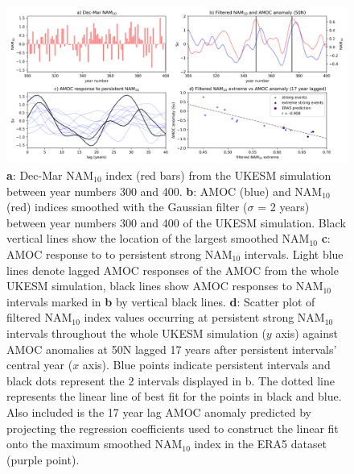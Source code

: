 \begin{figure}[h!]
\begin{center}
\noindent\includegraphics[width =\linewidth]{Figures/Figures-surface/AMOC_response_special_events.png} 
\caption[Regression of NAM$_{10}$ extreme magnitude vs AMOC anomaly at 50N]{\textbf{a}: Dec-Mar NAM$_{10}$ index (red bars) from the UKESM simulation between year numbers 300 and 400. \textbf{b}: AMOC (blue) and NAM$_{10}$ (red) indices smoothed with the Gaussian filter ($\sigma$ = 2 years) between year numbers 300 and 400 of the UKESM simulation. Black vertical lines show the location of the largest smoothed NAM$_{10}$  \textbf{c}: AMOC response to to persistent strong NAM$_{10}$ intervals. Light blue lines denote lagged AMOC responses of the AMOC from the whole UKESM simulation, black lines show AMOC responses to NAM$_{10}$ intervals marked in \textbf{b} by vertical black lines. \textbf{d}: Scatter plot of filtered NAM$_{10}$ index values occurring at persistent strong NAM$_{10}$ intervals throughout the whole UKESM simulation ($y$ axis) against AMOC anomalies at 50N lagged 17 years after persistent intervals' central year ($x$ axis). Blue points indicate persistent intervals and black dots represent the 2 intervals displayed in b. The dotted line represents the linear line of best fit for the points in black and blue. Also included is the 17 year lag AMOC anomaly predicted by projecting the regression coefficients used to construct the linear fit onto the maximum smoothed NAM$_{10}$ index in the ERA5 dataset (purple point).}
\label{special_events}
\end{center}
\end{figure}

